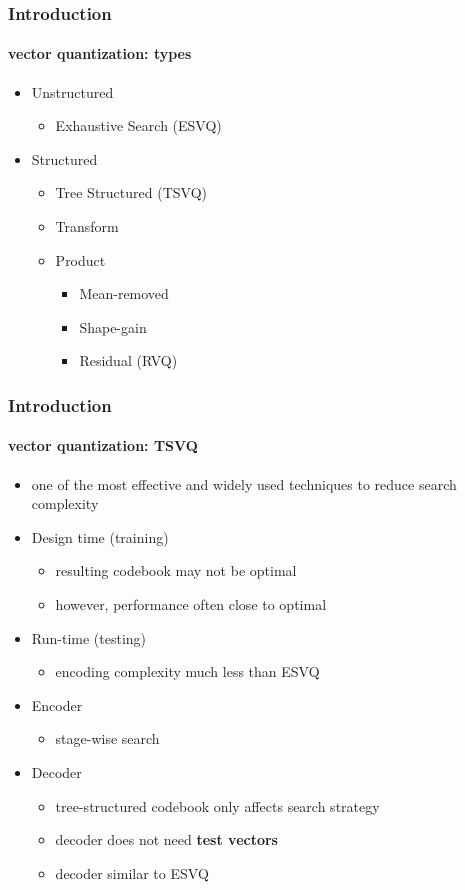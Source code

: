 \begin{frame}
\frametitle{Introduction}
\framesubtitle{vector quantization: types}
\logoCSIPCPL\mypagenum
	\begin{itemize}
		\item Unstructured
			\begin{itemize}
				\item Exhaustive Search (ESVQ)
			\end{itemize}
		\item Structured
		\begin{itemize}
			\item Tree Structured (TSVQ)
			\item Transform
			\item Product
				\begin{itemize}
					\item Mean-removed
					\item Shape-gain
					\item Residual (RVQ)
				\end{itemize}
		\end{itemize}
	\end{itemize}
\end{frame}


\begin{frame}
\frametitle{Introduction}
\framesubtitle{vector quantization: TSVQ}
\logoCSIPCPL\mypagenum
	\begin{itemize}
		\item one of the most effective and widely used techniques to reduce search complexity
		\item {\color{red}Design time (training)}
			\begin{itemize}
				\item resulting codebook may not be optimal
				\item however, performance often close to optimal
			\end{itemize}
		\item {\color{red}Run-time (testing)}
			\begin{itemize}
				\item encoding complexity much less than ESVQ
			\end{itemize}
		\item {\color{red}Encoder}
			\begin{itemize}
				\item stage-wise search
			\end{itemize}
		\item {\color{red}Decoder}
			\begin{itemize}
				\item tree-structured codebook only affects search strategy
				\item decoder does not need \textbf{test vectors}
				\item decoder similar to ESVQ
			\end{itemize}
	\end{itemize}
\end{frame}






